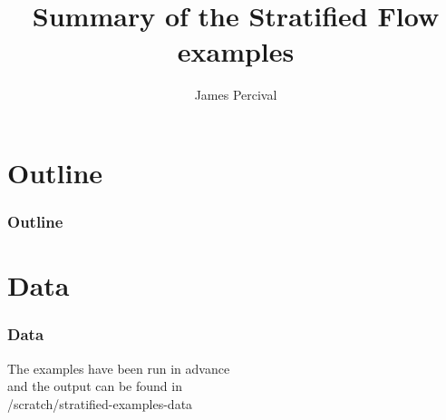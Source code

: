 \documentclass[10pt]{beamer}
\title[Stratified flow examples]{Summary of the Stratified Flow examples}
\subtitle[]{}
\institute{Department of Earth Science and Engineering, Imperial College London}
\author[James Percival]{\large{James Percival}}
\date{}
\begin{document}
\begin{frame}
  \titlepage
\end{frame}

\section*{Outline}
\begin{frame}
  \frametitle{Outline}
  \tableofcontents
\end{frame}



\section*{Data}
\begin{frame}
  \frametitle{Data}
  \begin{center}
  The examples have been run in advance \\ and the output can be found in \\ /scratch/stratified-examples-data
  \end{center}
\end{frame}
\end{document}
